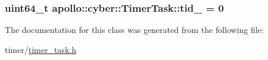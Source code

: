 \hypertarget{classapollo_1_1cyber_1_1TimerTask_a9fe857ede3438525c040f0fae5e510d3}{
\subsubsection[{tid\-\_\-}]{\setlength{\rightskip}{0pt plus 5cm}uint64\-\_\-t apollo\-::cyber\-::\-Timer\-Task\-::tid\-\_\- = 0\hspace{0.3cm}{\ttfamily [private]}}}\label{classapollo_1_1cyber_1_1TimerTask_a9fe857ede3438525c040f0fae5e510d3}


The documentation for this class was generated from the following file\-:\begin{DoxyCompactItemize}
\item 
timer/\hyperlink{timer__task_8h}{timer\-\_\-task.\-h}\end{DoxyCompactItemize}
